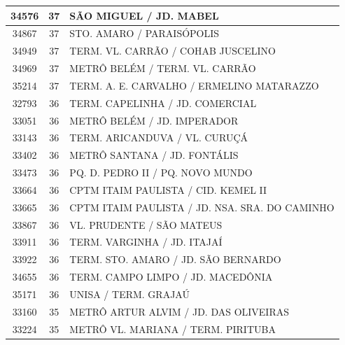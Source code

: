 \documentclass[
	12pt,				%
	oneside,			%
	a4paper,			%
	english,			%
	brazil				%
	]{abntex2ppgsi}
\begin{document}
\begin{apendicesenv}
\begin{longtable}{c|c|p{7cm}}
    34576 & 37    & SÃO MIGUEL / JD. MABEL \\
\hline

    34867 & 37    & STO. AMARO / PARAISÓPOLIS \\
\hline

    34949 & 37    & TERM. VL. CARRÃO / COHAB JUSCELINO \\
\hline

    34969 & 37    & METRÔ BELÉM / TERM. VL. CARRÃO \\
\hline

    35214 & 37    & TERM. A. E. CARVALHO / ERMELINO MATARAZZO \\
\hline

    32793 & 36    & TERM. CAPELINHA / JD. COMERCIAL \\
\hline

    33051 & 36    & METRÔ BELÉM / JD. IMPERADOR \\
\hline

    33143 & 36    & TERM. ARICANDUVA / VL. CURUÇÁ \\
\hline

    33402 & 36    & METRÔ SANTANA / JD. FONTÁLIS \\
\hline

    33473 & 36    & PQ. D. PEDRO II / PQ. NOVO MUNDO \\
\hline

    33664 & 36    & CPTM ITAIM PAULISTA / CID. KEMEL II \\
\hline

    33665 & 36    & CPTM ITAIM PAULISTA / JD. NSA. SRA. DO CAMINHO \\
\hline

    33867 & 36    & VL. PRUDENTE / SÃO MATEUS \\
\hline

    33911 & 36    & TERM. VARGINHA / JD. ITAJAÍ \\
\hline

    33922 & 36    & TERM. STO. AMARO / JD. SÃO BERNARDO \\
\hline

    34655 & 36    & TERM. CAMPO LIMPO / JD. MACEDÔNIA \\
\hline

    35171 & 36    & UNISA / TERM. GRAJAÚ \\
\hline

    33160 & 35    & METRÔ ARTUR ALVIM / JD. DAS OLIVEIRAS \\
\hline

    33224 & 35    & METRÔ VL. MARIANA / TERM. PIRITUBA \\
\hline


\end{longtable}
\end{apendicesenv}
\end{document}
